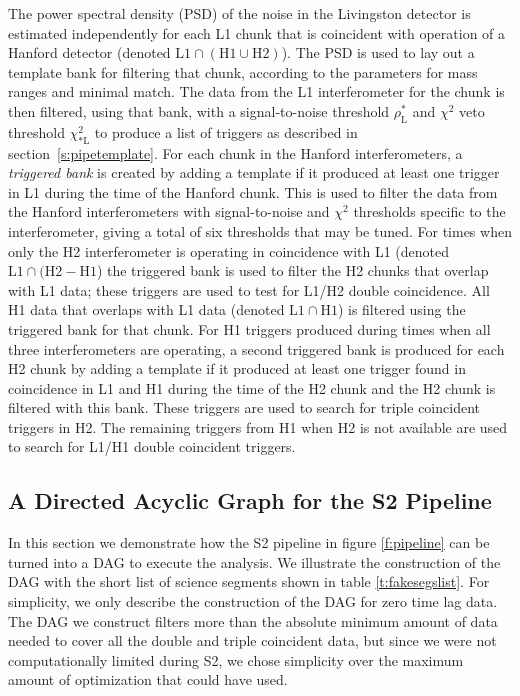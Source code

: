 The power spectral density (PSD) of the noise in the Livingston detector is
estimated independently for each L1 chunk that is coincident with operation of
a Hanford detector (denoted $\mathrm{L1} \cap (\mathrm{H1} \cup
\mathrm{H2})$).  The PSD is used to lay out a template bank for filtering that
chunk, according to the parameters for mass ranges and minimal
match\cite{Owen:1998dk}. The data from the L1 interferometer for the chunk is
then filtered, using that bank, with a signal-to-noise threshold
$\rho_{\mathrm{L}}^\ast$ and $\chi^2$ veto threshold $\chi^2_{\ast\mathrm{L}}$
to produce a list of triggers as described in section~\ref{s:pipetemplate}.
For each chunk in the Hanford interferometers, a \emph{triggered bank} is
created by adding a template if it produced at least one trigger in L1 during
the time of the Hanford chunk.  This is used to filter the data from the
Hanford interferometers with signal-to-noise and $\chi^2$ thresholds specific
to the interferometer, giving a total of six thresholds that may be tuned.
For times when only the H2 interferometer is operating in coincidence with L1
(denoted $\mathrm{L1} \cap (\mathrm{H2} - \mathrm{H1}$) the triggered bank is
used to filter the H2 chunks that overlap with L1 data; these triggers are
used to test for L1/H2 double coincidence.  All H1 data that overlaps with L1
data (denoted $\mathrm{L1} \cap \mathrm{H1}$) is filtered using the triggered
bank for that chunk. For H1 triggers produced during times when all three
interferometers are operating, a second triggered bank is produced for each H2
chunk by adding a template if it produced at least one trigger found in
coincidence in L1 and H1 during the time of the H2 chunk and the H2 chunk is
filtered with this bank.  These triggers are used to search for triple
coincident triggers in H2.  The remaining triggers from H1 when H2 is not
available are used to search for L1/H1 double coincident triggers.

\subsection{A Directed Acyclic Graph for the S2 Pipeline}
\label{ss:dag}

In this section we demonstrate how the S2 pipeline in figure \ref{f:pipeline}
can be turned into a DAG to execute the analysis. We illustrate the
construction of the DAG with the short list of science segments shown in table
\ref{t:fakesegslist}. For simplicity, we only describe the construction of the
DAG for zero time lag data. The DAG we construct filters more than the
absolute minimum amount of data needed to cover all the double and triple
coincident data, but since we were not computationally limited during S2, we
chose simplicity over the maximum amount of optimization that could have used.


